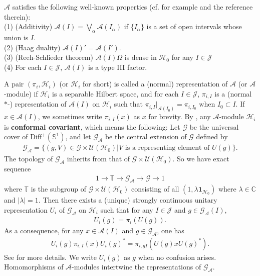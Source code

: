 \documentclass[11pt,b5paper,notitlepage]{article}
\theoremstyle{definition}
\theoremstyle{plain}
\newcommand{\mc}{\mathcal}
\newcommand{\id}{\mathbf{1}}
\newcommand{\Diffp}{\mathrm{Diff}^+}
\newcommand{\GA}{\mathscr G_{\mathcal A}}
\newcommand{\scr}{\mathscr}
\newcommand{\mbb}{\mathbb}
\numberwithin{equation}{subsection}
\begin{document}
$\mathcal A$ satisfies the following well-known properties (cf. for example \cite{GL96} and the reference therein):\\
(1) (Additivity) $\mathcal A(I)=\bigvee_\alpha\mathcal A(I_\alpha)$ if $\{I_\alpha\}$ is a set of open intervals whose union is $I$.\\
(2) (Haag duality) $\mathcal A(I)'=\mathcal A(I')$.\\ 
(3) (Reeh-Schlieder theorem) $\mathcal A(I)\Omega$ is dense in $\mathcal H_0$ for any $I\in\mathcal J$\\
(4) For each $I\in\mathcal J$, $\mathcal A(I)$ is a type III factor.


A pair $(\pi_i,\mc H_i)$ (or $\mc H_i$ for short) is called a (normal) representation of $\mc A$ (or $\mc A$-module) if $\mc H_i$ is a separable Hilbert space, and for each $I\in\mc J$, $\pi_{i,I}$ is a (normal $*$-) representation of $\mc A(I)$ on $\mc H_i$ such that $\pi_{i,I}|_{\mc A(I_0)}=\pi_{i,I_0}$ when $I_0\subset I$. If $x\in\mc A(I)$, we sometimes write $\pi_{i,I}(x)$ as $x$ for brevity. By \cite{Hen19}, any $\mc A$-module $\mc H_i$ is \textbf{conformal covariant}, which means the following: Let $\scr G$ be the universal cover of $\Diffp(\mbb S^1)$, and let $\GA$ be the central extension of $\scr G$ defined by 
\begin{align}
\GA=\{(g,V)\in\mathscr G\times \mathcal U(\mathcal H_0)| V \textrm{ is a representing element of } U(g) \}.\label{eq35}
\end{align}
The topology of $\GA$ inherits from that of $\scr G\times\mc U(\mc H_0)$. So we have exact sequence
\begin{align}
1\rightarrow \mbb T\rightarrow\GA\rightarrow\scr G\rightarrow 1
\end{align}
where $\mbb T$ is the subgroup of $\scr G\times\mc U(\mc H_0)$ consisting of all $(1,\lambda\id_{\mc H_0})$ where $\lambda\in\mbb C$ and $|\lambda|=1$. Then there exists a (unique) strongly continuous unitary representation $U_i$ of $\GA$ on $\mc H_i$ such that for any $I\in\mc J$ and $g\in\GA(I)$,
\begin{align}
U_i(g)=\pi_i(U(g)).\label{eq34}
\end{align}
As a consequence, for any $x\in\mc A(I)$ and $g\in\GA$, one has
\begin{align}
U_i(g)\pi_{i,I}(x)U_i(g)^*=\pi_{i,gI}(U(g)xU(g)^*).
\end{align}
See \cite{Gui21a} for more details. We  write $U_i(g)$ as $g$ when no confusion arises. Homomorphisms of $\mc A$-modules intertwine the representations of $\GA$.
\end{document}
